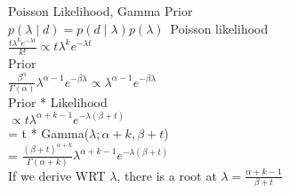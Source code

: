 \documentclass[12pt,fleqn,leqno,letterpaper]{article}
\begin{document}
Poisson Likelihood, Gamma Prior \\
$p(\lambda \mid d) = p(d \mid \lambda) p(\lambda) $\
Poisson likelihood\\
 $ \frac{t\lambda^{k} e^{-\lambda t}}{k!} \propto t\lambda^{k} e^{-\lambda t} $\\
Prior\\
$ \frac{\beta^{\alpha}}{\Gamma(\alpha)}\lambda^{\alpha - 1} e^{-\beta\lambda} \propto \lambda^{\alpha -1} e^{-\beta \lambda} $\\
Prior * Likelihood\\
$ \propto t\lambda^{\alpha + k - 1} e^{-\lambda(\beta+t)} $\\
= t * Gamma($\lambda;\alpha+k,\beta+t$)\\
= 
$\frac{(\beta+t)^{\alpha+k}}{\Gamma(\alpha+k)} \lambda^{\alpha+k-1} e^{-\lambda(\beta + t)}$\\
If we derive WRT $\lambda$, there is a root at
$ \lambda = \frac{\alpha + k -1}{\beta + t} $ 









\end{document}
